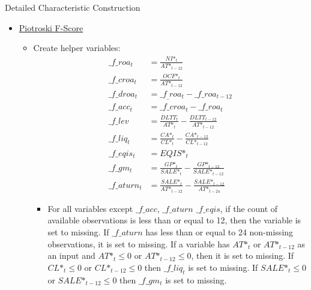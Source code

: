 \documentclass[12pt,title,fleqn]{article}
\begin{document}
\begin{section}{Detailed Characteristic Construction}
\begin{itemize}
        \item \hyperlink{pio2}{\hypertarget{pio}{Piotroski F-Score}}
            \begin{itemize}
                \item Create helper variables: 
                    \begin{align*}
                        \_f\_roa_t &= \frac{NI\mbox{*}_t}{AT\mbox{*}_{t-12}} \\
                        \_f\_croa_t &= \frac{OCF\mbox{*}_t}{AT\mbox{*}_{t-12}} \\
                        \_f\_droa_t &= \_f_\_roa_t - \_f\_roa_{t-12} \\
                        \_f\_acc_t &= \_f\_croa_t - \_f\_roa_t \\
                        \_f\_lev &= \frac{DLTT_t}{AT\mbox{*}_t} - \frac{DLTT_{t-12}}{AT\mbox{*}_{t-12}} \\
                        \_f\_liq_t &= \frac{CA\mbox{*}_t}{CL\mbox{*}_t} - \frac{CA\mbox{*}_{t-12}}{CL\mbox{*}_{t-12}} \\
                        \_f\_eqis_t &= EQIS\mbox{*}_t \\
                        \_f\_gm_t &= \frac{GP\mbox{*}_t}{SALE\mbox{*}_t} - \frac{GP\mbox{*}_{t-12}}{SALE\mbox{*}_{t-12}} \\
                        \_f\_aturn_t &= \frac{SALE\mbox{*}_t}{AT\mbox{*}_{t-12}} - \frac{SALE\mbox{*}_{t-12}}{AT\mbox{*}_{t-24}} 
                    \end{align*}
                    
                    \begin{itemize}
                        \item For all variables except $\_f\_acc$, $\_f\_aturn$ $\_f\_eqis$, if the count of available observations is less than or equal to 12, then the variable is set to missing. If $\_f\_aturn$ has less than or equal to 24 non-missing observations, it is set to missing. If a variable has $AT\mbox{*}_t$ or $AT\mbox{*}_{t-12}$ as an input and $AT\mbox{*}_t \leq 0$ or $AT\mbox{*}_{t-12} \leq 0$, then it is set to missing. If $CL\mbox{*}_t \leq 0$ or $CL\mbox{*}_{t-12} \leq 0$ then $\_f\_liq_t$ is set to missing. If $SALE\mbox{*}_t \leq 0$ or $SALE\mbox{*}_{t-12} \leq 0$ then $\_f\_gm_t$ is set to missing.
                    \end{itemize}
                    

\end{itemize}
\end{itemize}
\end{section}
\end{document}
